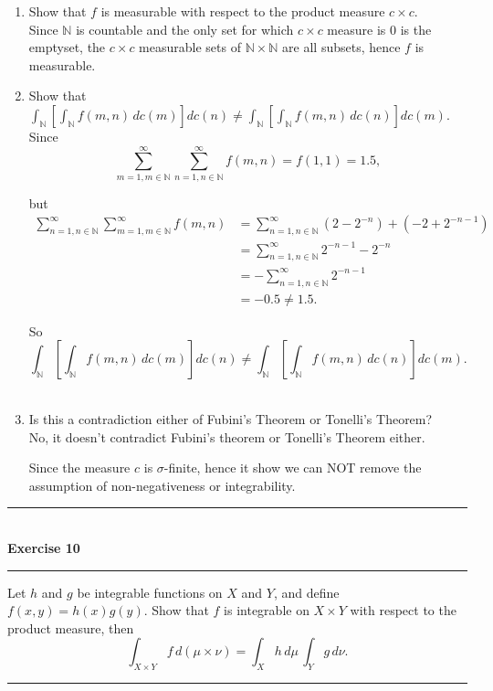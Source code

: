 \documentclass[a4paper,11pt]{article}
\begin{document}
\begin{enumerate}
	\item Show that $f$ is measurable with respect to the product measure $c \times c$.\\

		Since $\mathbb{N}$ is countable and the only set for which $c \times c$ measure is $0$ is the emptyset, the $c \times c$ measurable sets of $\mathbb{N} \times \mathbb{N}$ are all subsets, hence $f$ is measurable.\\

	\item Show that
			$\int_{\mathbb{N}} \left[\int_{\mathbb{N}} f(m,n)\,dc(m)\right]dc(n)
			\neq
			\int_{\mathbb{N}} \left[\int_{\mathbb{N}} f(m,n)\,dc(n)\right]dc(m).$\\

		Since
			$$\sum_{m = 1, m \in \mathbb{N}}^\infty \sum_{n = 1, n \in \mathbb{N}}^\infty f(m,n)
			= f(1,1) = 1.5,$$

		but
			$$\begin{aligned}
			\sum_{n = 1, n \in \mathbb{N}}^\infty \sum_{m = 1, m \in \mathbb{N}}^\infty f(m,n)
			&= \sum_{n = 1, n \in \mathbb{N}}^\infty (2 - 2^{-n}) + (-2 + 2^{-n-1})\\
			&= \sum_{n = 1, n \in \mathbb{N}}^\infty 2^{-n-1} - 2^{-n}\\
			&= - \sum_{n = 1, n \in \mathbb{N}}^\infty 2^{-n-1}\\
			&= -0.5 \neq 1.5.
			\end{aligned}$$

		So 
			$$\int_{\mathbb{N}} \left[\int_{\mathbb{N}} f(m,n)\,dc(m)\right]dc(n)
			\neq
			\int_{\mathbb{N}} \left[\int_{\mathbb{N}} f(m,n)\,dc(n)\right]dc(m).$$\\

	\item Is this a contradiction either of Fubini's Theorem or Tonelli's Theorem?\\

		No, it doesn't contradict Fubini's theorem or Tonelli's Theorem either.

		Since the measure $c$ is $\sigma$-finite, hence it show we can NOT remove the assumption of non-negativeness or integrability.\\
\end{enumerate}




\begin{flushleft}
	\rule[-0.5ex]{17cm}{2pt}\\
		\textbf{Exercise 10}\\
	\rule[1.5ex]{17cm}{0.5pt}
		Let $h$ and $g$ be integrable functions on $X$ and $Y$, and define $f(x,y) = h(x)g(y)$. Show that $f$ is integrable on $X \times Y$ with respect to the product measure, then
			$$\int_{X \times Y} f\,d(\mu \times \nu)
			= \int_X h\,d\mu\,\int_Y g\,d\nu.$$
	\rule[1.0ex]{17cm}{0.5pt}\
\end{flushleft}
\end{document}

